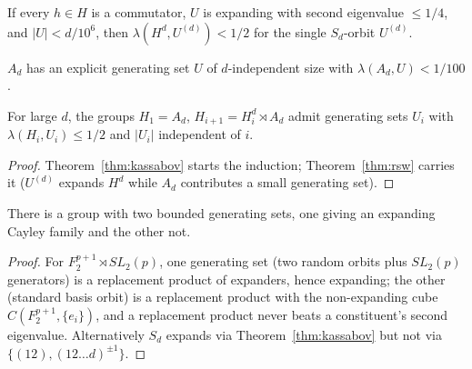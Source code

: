 \begin{theorem}
  \label{thm:rsw}
  \notready
  If every $h\in H$ is a commutator, $U$ is expanding with second eigenvalue
  $\le1/4$, and $|U|<d/10^6$, then $\lambda(H^d,U^{(d)})<1/2$ for the single
  $S_d$-orbit $U^{(d)}$.
\end{theorem}

\begin{theorem}
  \label{thm:kassabov}
  \notready
  $A_d$ has an explicit generating set $U$ of $d$-independent size with
  $\lambda(A_d,U)<1/100$.
\end{theorem}

\begin{corollary}
  \label{cor:rsw-wreath}
  For large $d$, the groups $H_1=A_d$, $H_{i+1}=H_i^d\rtimes A_d$ admit generating
  sets $U_i$ with $\lambda(H_i,U_i)\le1/2$ and $|U_i|$ independent of $i$.
\end{corollary}
\begin{proof}
  Theorem~\ref{thm:kassabov} starts the induction; Theorem~\ref{thm:rsw} carries
  it ($U^{(d)}$ expands $H^d$ while $A_d$ contributes a small generating set).
\end{proof}

\begin{theorem}
  \label{thm:expansion-not-group}
  There is a group with two bounded generating sets, one giving an expanding
  Cayley family and the other not.
\end{theorem}
\begin{proof}
  For $F_2^{p+1}\rtimes SL_2(p)$, one generating set (two random orbits plus
  $SL_2(p)$ generators) is a replacement product of expanders, hence expanding;
  the other (standard basis orbit) is a replacement product with the
  non-expanding cube $C(F_2^{p+1},\{e_i\})$, and a replacement product never
  beats a constituent's second eigenvalue. Alternatively $S_d$ expands via
  Theorem~\ref{thm:kassabov} but not via $\{(12),(12\ldots d)^{\pm1}\}$.
\end{proof}

